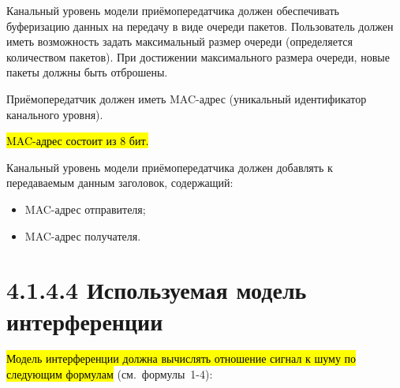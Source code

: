 Канальный уровень модели приёмопередатчика должен обеспечивать
буферизацию данных на передачу в виде очереди пакетов. Пользователь
должен иметь возможность задать максимальный размер очереди
(определяется количеством пакетов). При достижении максимального размера
очереди, новые пакеты должны быть отброшены.

Приёмопередатчик должен иметь MAC-адрес (уникальный идентификатор
канального уровня).

\hl{MAC-адрес состоит из 8 бит.}

Канальный уровень модели приёмопередатчика должен добавлять к
передаваемым данным заголовок, содержащий:

\begin{itemize}
\item
  MAC-адрес отправителя;
\item
  MAC-адрес получателя.
\end{itemize}

\section{4.1.4.4 Используемая модель
интерференции}\label{ux438ux441ux43fux43eux43bux44cux437ux443ux435ux43cux430ux44f-ux43cux43eux434ux435ux43bux44c-ux438ux43dux442ux435ux440ux444ux435ux440ux435ux43dux446ux438ux438}

\hl{Модель интерференции должна вычислять отношение сигнал к шуму по
следующим формулам} (см.~формулы~1-4):\hl{}


